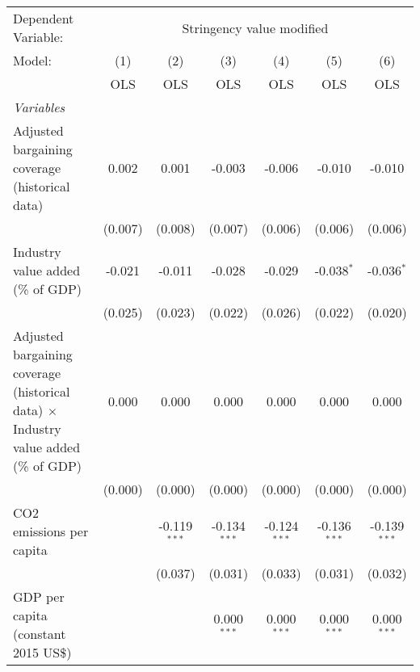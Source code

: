 
\begingroup
\centering
\begin{tabular}{lcccccc}
   \toprule
   Dependent Variable: & \multicolumn{6}{c}{Stringency value modified}\\
   Model:                                                                                     & (1)     & (2)            & (3)            & (4)            & (5)            & (6)\\  
                                                                                              &  OLS    & OLS            & OLS            & OLS            & OLS            & OLS\\  
   \midrule
   \emph{Variables}\\
   Adjusted bargaining coverage (historical data)                                             & 0.002   & 0.001          & -0.003         & -0.006         & -0.010         & -0.010\\   
                                                                                              & (0.007) & (0.008)        & (0.007)        & (0.006)        & (0.006)        & (0.006)\\   
   Industry value added (\% of GDP)                                                           & -0.021  & -0.011         & -0.028         & -0.029         & -0.038$^{*}$   & -0.036$^{*}$\\   
                                                                                              & (0.025) & (0.023)        & (0.022)        & (0.026)        & (0.022)        & (0.020)\\   
   Adjusted bargaining coverage (historical data) $\times$ Industry value added (\% of GDP)   & 0.000   & 0.000          & 0.000          & 0.000          & 0.000          & 0.000\\   
                                                                                              & (0.000) & (0.000)        & (0.000)        & (0.000)        & (0.000)        & (0.000)\\   
   CO2 emissions per capita                                                                   &         & -0.119$^{***}$ & -0.134$^{***}$ & -0.124$^{***}$ & -0.136$^{***}$ & -0.139$^{***}$\\   
                                                                                              &         & (0.037)        & (0.031)        & (0.033)        & (0.031)        & (0.032)\\   
   GDP per capita (constant 2015 US\$)                                                        &         &                & 0.000$^{***}$  & 0.000$^{***}$  & 0.000$^{***}$  & 0.000$^{***}$\\   

\end{tabular}
